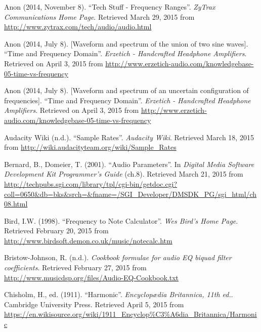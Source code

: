 \documentclass[12pt]{report}
\newcommand{\referenceheaders}{
	\fancyhead[R]{
		\leftmark
	}	
}
\begin{document}
\referenceheaders
\begin{thebibliography}{100}
	 Anon (2014, November 8). ``Tech Stuff - Frequency Ranges''. \emph{ZyTrax Communications Home Page}. Retrieved March 29, 2015 from \url{http://www.zytrax.com/tech/audio/audio.html}

	 Anon (2014, July 8). [Waveform and spectrum of the union of two sine waves]. ``Time and Frequency Domain''. \emph{Erzetich - Handcrafted Headphone Amplifiers}. Retrieved on April 3, 2015 from \url{http://www.erzetich-audio.com/knowledgebase-05-time-vs-frequency}

	 Anon (2014, July 8). [Waveform and spectrum of an uncertain configuration of frequencies]. ``Time and Frequency Domain''. \emph{Erzetich - Handcrafted Headphone Amplifiers}. Retrieved on April 3, 2015 from \url{http://www.erzetich-audio.com/knowledgebase-05-time-vs-frequency}

	 Audacity Wiki (n.d.). ``Sample Rates''. \emph{Audacity Wiki}. Retrieved March 18, 2015 from \url{http://wiki.audacityteam.org/wiki/Sample_Rates}

	 Bernard, B., Domeier, T. (2001). ``Audio Parameters''. In \emph{Digital Media Software Development Kit Programmer's Guide} (ch.8). Retrieved March 21, 2015 from \url{http://techpubs.sgi.com/library/tpl/cgi-bin/getdoc.cgi?coll=0650&db=bks&srch=&fname=/SGI_Developer/DMSDK_PG/sgi_html/ch08.html}

	 Bird, I.W. (1998). ``Frequency to Note Calculator''. \emph{Wes Bird's Home Page}. Retrieved February 20, 2015 from \url{http://www.birdsoft.demon.co.uk/music/notecalc.htm}
	
	 Bristow-Johnson, R. (n.d.). \emph{Cookbook formulae for audio EQ biquad filter coefficients}. Retrieved February 27, 2015 from \url{http://www.musicdsp.org/files/Audio-EQ-Cookbook.txt}
	
	 Chisholm, H., ed. (1911). ``Harmonic''. \emph{Encyclop\ae dia Britannica, 11th ed.}. Cambridge University Press. Retrieved April 5, 2015 from \url{https://en.wikisource.org/wiki/1911_Encyclop%C3%A6dia_Britannica/Harmonic}
	

\end{thebibliography}
\end{document}
